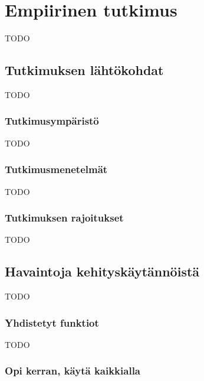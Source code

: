 \vspace{21.5pt}
\chapter{Empiirinen tutkimus}

TODO

\section{Tutkimuksen lähtökohdat}

TODO

\subsection{Tutkimusympäristö}

TODO

\subsection{Tutkimusmenetelmät}

TODO

\subsection{Tutkimuksen rajoitukset}


TODO
\section{Havaintoja kehityskäytännöistä}

TODO


\subsection{Yhdistetyt funktiot}

TODO

\subsection{Opi kerran, käytä kaikkialla}


